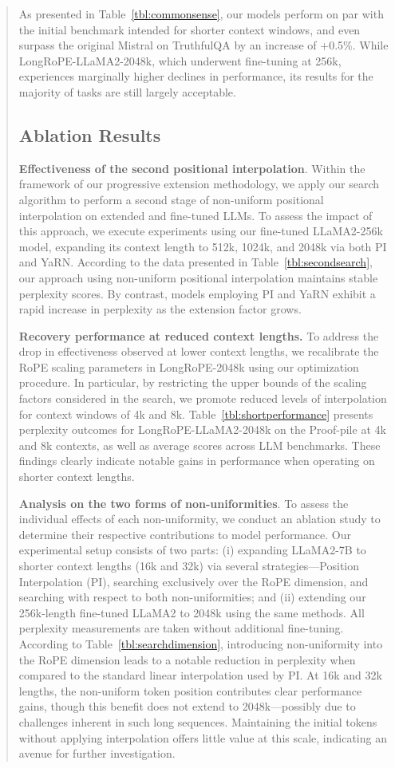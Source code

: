 \begin{abstract}
As presented in Table~\ref{tbl:commonsense}, our models perform on par with the initial benchmark intended for shorter context windows, and even surpass the original Mistral on TruthfulQA by an increase of +0.5\%. While LongRoPE-LLaMA2-2048k, which underwent fine-tuning at 256k, experiences marginally higher declines in performance, its results for the majority of tasks are still largely acceptable.

\subsection{Ablation Results}

\textbf{Effectiveness of the second positional interpolation}. Within the framework of our progressive extension methodology, we apply our search algorithm to perform a second stage of non-uniform positional interpolation on extended and fine-tuned LLMs. To assess the impact of this approach, we execute experiments using our fine-tuned LLaMA2-256k model, expanding its context length to 512k, 1024k, and 2048k via both PI and YaRN. According to the data presented in Table~\ref{tbl:secondsearch}, our approach using non-uniform positional interpolation maintains stable perplexity scores. By contrast, models employing PI and YaRN exhibit a rapid increase in perplexity as the extension factor grows.

\textbf{Recovery performance at reduced context lengths.} To address the drop in effectiveness observed at lower context lengths, we recalibrate the RoPE scaling parameters in LongRoPE-2048k using our optimization procedure. In particular, by restricting the upper bounds of the scaling factors considered in the search, we promote reduced levels of interpolation for context windows of 4k and 8k. Table~\ref{tbl:shortperformance} presents perplexity outcomes for LongRoPE-LLaMA2-2048k on the Proof-pile at 4k and 8k contexts, as well as average scores across LLM benchmarks. These findings clearly indicate notable gains in performance when operating on shorter context lengths.

\textbf{Analysis on the two forms of non-uniformities}. To assess the individual effects of each non-uniformity, we conduct an ablation study to determine their respective contributions to model performance. Our experimental setup consists of two parts: (i) expanding LLaMA2-7B to shorter context lengths (16k and 32k) via several strategies—Position Interpolation (PI), searching exclusively over the RoPE dimension, and searching with respect to both non-uniformities; and (ii) extending our 256k-length fine-tuned LLaMA2 to 2048k using the same methods. All perplexity measurements are taken without additional fine-tuning. According to Table~\ref{tbl:searchdimension}, introducing non-uniformity into the RoPE dimension leads to a notable reduction in perplexity when compared to the standard linear interpolation used by PI. At 16k and 32k lengths, the non-uniform token position contributes clear performance gains, though this benefit does not extend to 2048k—possibly due to challenges inherent in such long sequences. Maintaining the initial tokens without applying interpolation offers little value at this scale, indicating an avenue for further investigation.


\end{abstract}
